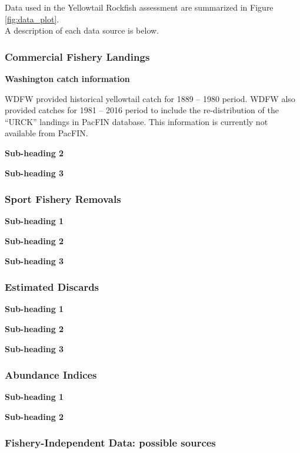 \documentclass[12pt,]{article}
\begin{document}
Data used in the Yellowtail Rockfish assessment are summarized in Figure
\ref{fig:data_plot}.\\
A description of each data source is below.

\subsubsection{Commercial Fishery
Landings}\label{commercial-fishery-landings}

\textbf{Washington catch information}

WDFW provided historical yellowtail catch for 1889 -- 1980 period. WDFW
also provided catches for 1981 -- 2016 period to include the
re-distribution of the ``URCK'' landings in PacFIN database. This
information is currently not available from PacFIN.

\textbf{Sub-heading 2}

\textbf{Sub-heading 3}

\subsubsection{Sport Fishery Removals}\label{sport-fishery-removals}

\textbf{Sub-heading 1}

\textbf{Sub-heading 2}

\textbf{Sub-heading 3}

\subsubsection{Estimated Discards}\label{estimated-discards}

\textbf{Sub-heading 1}

\textbf{Sub-heading 2}

\textbf{Sub-heading 3}

\subsubsection{Abundance Indices}\label{abundance-indices}

\textbf{Sub-heading 1}

\textbf{Sub-heading 2}

\subsubsection{Fishery-Independent Data: possible
sources}\label{fishery-independent-data-possible-sources}
\end{document}
